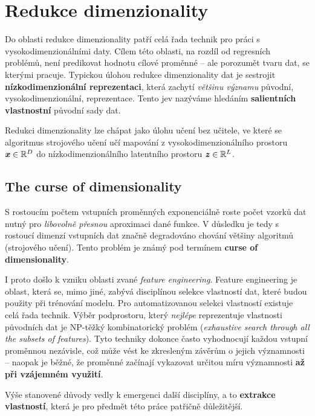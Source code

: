 \section{Redukce dimenzionality}
\label{sec:dimensionality_reduction}

Do oblasti redukce dimenzionality patří celá řada technik pro práci s vysokodimenzionálními daty.
Cílem této oblasti, na rozdíl od regresních problémů, není predikovat hodnotu cílové proměnné – ale porozumět tvaru dat, se kterými pracuje.
Typickou úlohou redukce dimenzionality dat je sestrojit \textbf{nízkodimenzionální reprezentaci}, která zachytí \emph{většinu významu} původní, vysokodimenzionální, reprezentace.
Tento jev nazýváme hledáním \textbf{salientních vlastnostní} původní sady dat. \cite{Phillips2021}

Redukci dimenzionality lze chápat jako úlohu učení bez učitele, ve které se algoritmus strojového učení učí mapování z vysokodimenzionálního prostoru $\textbf{\emph{x}} \in \mathbb{R}^D$ do nízkodimenzionálního latentního prostoru $\textbf{\emph{z}} \in \mathbb{R}^L$. \cite{Murphy2022}

\subsection{The curse of dimensionality}
S rostoucím počtem vstupních proměnných exponenciálně roste počet vzorků dat nutný pro \emph{libovolně přesnou} aproximaci dané funkce.
V důsledku je tedy s rostoucí dimenzí vstupních dat značně degradováno chování většiny algoritmů (strojového učení).
Tento problém je známý pod termínem \textbf{curse of dimensionality}. \cite{Bellman1957}

I proto došlo k vzniku oblasti zvané \emph{feature engineering}.
Feature engineering je oblast, která se, mimo jiné, zabývá disciplínou selekce vlastností dat, které budou použity při trénování modelu.
Pro automatizovanou selekci vlastností existuje celá řada technik.
Výběr podprostoru, který \emph{nejlépe} reprezentuje vlastnosti původních dat je NP-těžký kombinatorický problém (\emph{exhaustive search through all the subsets of features}).
Tyto techniky dokonce často vyhodnocují každou vstupní proměnnou nezávisle, což může vést ke zkresleným závěrům o jejich významnosti – naopak je běžné, že proměnné začínají vykazovat určitou míru významnosti \textbf{až při vzájemném využití}. \cite{Stanczyk2015}

Výše stanovené důvody vedly k emergenci další disciplíny, a to \textbf{extrakce vlastností}, která je pro předmět této práce patřičně důležitější.

